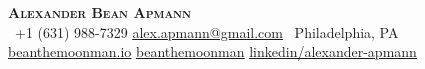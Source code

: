 \begin{center}
    \textbf{\Huge \scshape Alexander Bean Apmann} \\ \vspace{1pt}
     \ \small +1 (631) 988-7329 \quad
    \href{mailto:alex.apmann@gmail.com}{ \underline{alex.apmann@gmail.com}} \quad
     \ Philadelphia, PA \\
    \href{https://beanthemoonman.io}{ \underline{beanthemoonman.io}} \quad
    \href{https://github.com/beanthemoonman}{ \underline{beanthemoonman}} \quad
    \href{https://www.linkedin.com/in/alexander-apmann-a861897b/}{ \underline{linkedin/alexander-apmann}}
\end{center}